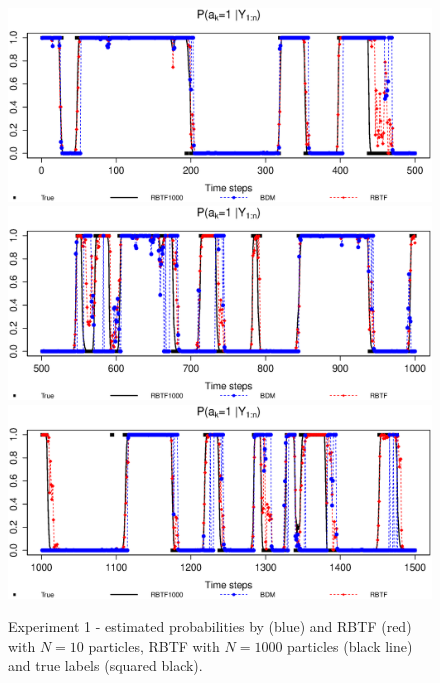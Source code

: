 \begin{figure}
\centering
\includegraphics[scale=.5]{N10_1_500.eps}
\includegraphics[scale=.5]{N10_501_1000.eps}
\includegraphics[scale=.5]{N10_1001_1500.eps}
\caption{Experiment 1 - estimated probabilities by \cite{briers:doucet:maskell:2010} (blue) and RBTF (red) with $N=10$ particles,  RBTF with $N=1000$ particles (black line) and true labels (squared black).}
\label{fig:exp1:label}
\end{figure}

